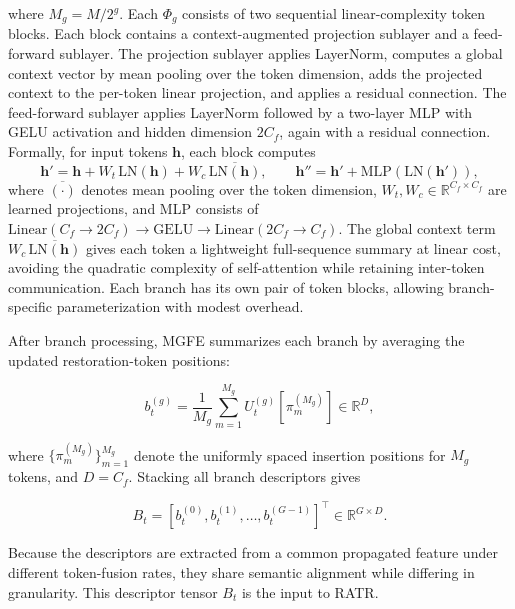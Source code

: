 where $M_g = M/2^g$. Each $\Phi_g$ consists of two sequential linear-complexity token blocks. Each block contains a context-augmented projection sublayer and a feed-forward sublayer. The projection sublayer applies LayerNorm, computes a global context vector by mean pooling over the token dimension, adds the projected context to the per-token linear projection, and applies a residual connection. The feed-forward sublayer applies LayerNorm followed by a two-layer MLP with GELU activation and hidden dimension $2C_f$, again with a residual connection. Formally, for input tokens $\mathbf{h}$, each block computes
\begin{equation}
\mathbf{h}' = \mathbf{h} + W_t\,\mathrm{LN}(\mathbf{h}) + W_c\,\overline{\mathrm{LN}(\mathbf{h})},\qquad
\mathbf{h}'' = \mathbf{h}' + \mathrm{MLP}(\mathrm{LN}(\mathbf{h}')),
\end{equation}
where $\overline{(\cdot)}$ denotes mean pooling over the token dimension, $W_t,W_c\in\mathbb{R}^{C_f\times C_f}$ are learned projections, and MLP consists of $\mathrm{Linear}(C_f\!\rightarrow\!2C_f)\!\rightarrow\!\mathrm{GELU}\!\rightarrow\!\mathrm{Linear}(2C_f\!\rightarrow\!C_f)$. The global context term $W_c\,\overline{\mathrm{LN}(\mathbf{h})}$ gives each token a lightweight full-sequence summary at linear cost, avoiding the quadratic complexity of self-attention while retaining inter-token communication. Each branch has its own pair of token blocks, allowing branch-specific parameterization with modest overhead.

After branch processing, MGFE summarizes each branch by averaging the updated restoration-token positions:

\begin{equation}
b_t^{(g)} =
\frac{1}{M_g}
\sum_{m=1}^{M_g}
U_t^{(g)}[\pi_m^{(M_g)}]
\in \mathbb{R}^{D},
\end{equation}

where $\{\pi_m^{(M_g)}\}_{m=1}^{M_g}$ denote the uniformly spaced insertion positions for $M_g$ tokens, and $D=C_f$. Stacking all branch descriptors gives

\begin{equation}
B_t =
\left[
b_t^{(0)}, b_t^{(1)}, \ldots, b_t^{(G-1)}
\right]^\top
\in \mathbb{R}^{G \times D}.
\end{equation}

Because the descriptors are extracted from a common propagated feature under different token-fusion rates, they share semantic alignment while differing in granularity. This descriptor tensor $B_t$ is the input to RATR.

